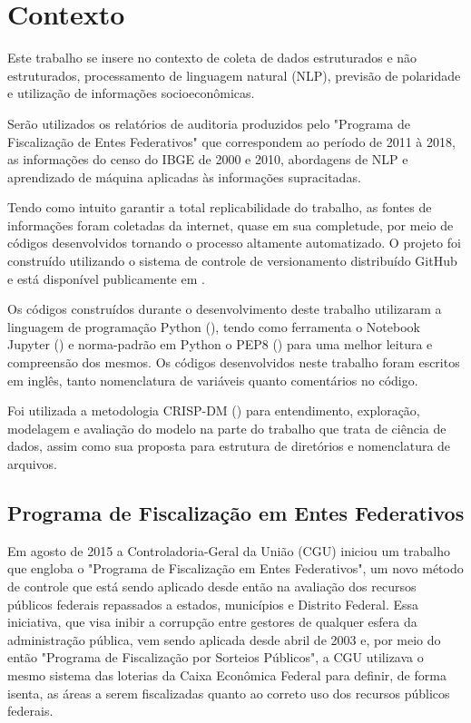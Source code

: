 \chapter{Contexto}
\label{cap:contexto}

Este trabalho se insere no contexto de coleta de dados estruturados e não estruturados, processamento de linguagem natural (NLP), previsão de polaridade e utilização de informações socioeconômicas.

Serão utilizados os relatórios de auditoria produzidos pelo "Programa de Fiscalização de Entes Federativos" que correspondem ao período de 2011 à 2018, as informações do censo do IBGE de 2000 e 2010, abordagens de NLP e aprendizado de máquina aplicadas às informações supracitadas.

Tendo como intuito garantir a total replicabilidade do trabalho, as fontes de informações foram coletadas da internet, quase em sua completude, por meio de códigos desenvolvidos tornando o processo altamente automatizado. O projeto foi construído utilizando o sistema de controle de versionamento distribuído GitHub e está disponível publicamente em \citet{GitHubLucas}.

Os códigos construídos durante o desenvolvimento deste trabalho utilizaram a linguagem de programação Python (\citet{Python}), tendo como ferramenta o Notebook Jupyter (\citet{JupyterNotebook}) e norma-padrão em Python o PEP8 (\citet{PEP8}) para uma melhor leitura e compreensão dos mesmos. Os códigos desenvolvidos neste trabalho foram escritos em inglês, tanto nomenclatura de variáveis quanto comentários no código.

Foi utilizada a metodologia CRISP-DM (\citet{CRISPDM}) para entendimento, exploração, modelagem e avaliação do modelo na parte do trabalho que trata de ciência de dados, assim como sua proposta para estrutura de diretórios e nomenclatura de arquivos.

\section{Programa de Fiscalização em Entes Federativos}
\label{sec:programa_de_fiscalizacao_em_entes_federativos}

Em agosto de 2015 a Controladoria-Geral da União (CGU) iniciou um trabalho que engloba o "Programa de Fiscalização em Entes Federativos", um novo método de controle que está sendo aplicado desde então na avaliação dos recursos públicos federais repassados a estados, municípios e Distrito Federal. Essa iniciativa, que visa inibir a corrupção entre gestores de qualquer esfera da administração pública, vem sendo aplicada desde abril de 2003 e, por meio do então "Programa de Fiscalização por Sorteios Públicos", a CGU utilizava o mesmo sistema das loterias da Caixa Econômica Federal para definir, de forma isenta, as áreas a serem fiscalizadas quanto ao correto uso dos recursos públicos federais.

